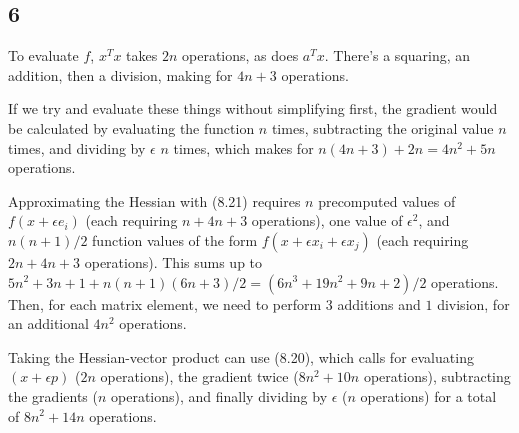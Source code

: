 \documentclass{article}
\newcommand{\ep}{\epsilon}
\begin{document}
\subsection*{6}
To evaluate $f$, $x^Tx$ takes $2n$ operations, as does $a^Tx$. There's a squaring, an addition, then a division, making for $4n+3$ operations.

%
%

If we try and evaluate these things without simplifying first, the gradient would be calculated by evaluating the function $n$ times, subtracting the original value $n$ times, and dividing by $\ep$ $n$ times, which makes for $n(4n+3)+2n=4n^2+5n$ operations. 

Approximating the Hessian with (8.21) requires $n$ precomputed values of $f(x+\ep e_i)$ (each requiring $n+4n+3$ operations), one value of $\ep^2$, and $n(n+1)/2$ function values of the form $f(x+\ep x_i+\ep x_j)$ (each requiring $2n+4n+3$ operations). This sums up to $5n^2+3n+1+n(n+1)(6n+3)/2=(6n^3+19n^2+9n+2)/2$ operations. Then, for each matrix element, we need to perform $3$ additions and $1$ division, for an additional $4n^2$ operations.

Taking the Hessian-vector product can use (8.20), which calls for evaluating $(x+\ep p)$ ($2n$ operations), the gradient twice ($8n^2+10n$ operations), subtracting the gradients ($n$ operations), and finally dividing by $\ep$ ($n$ operations) for a total of $8n^2+14n$ operations.
\end{document}

